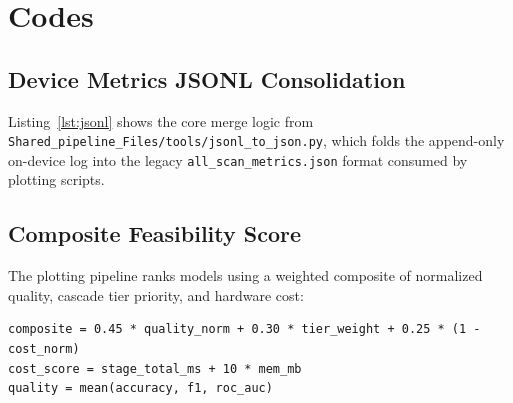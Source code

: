\lstset{
  language=Python,
  basicstyle=\ttfamily\small,
  numbers=left,
  numberstyle=\footnotesize,
  stepnumber=1,
  numbersep=2.0mm,
  breaklines=true}

\chapter{Codes}\label{ch:codes}

\section{Device Metrics JSONL Consolidation}
Listing~\ref{lst:jsonl} shows the core merge logic from \texttt{Shared\_pipeline\_Files/tools/jsonl\_to\_json.py}, which folds the append-only on-device log into the legacy \texttt{all\_scan\_metrics.json} format consumed by plotting scripts.



\section{Composite Feasibility Score}
The plotting pipeline ranks models using a weighted composite of normalized quality, cascade tier priority, and hardware cost:
\begin{lstlisting}[caption={Feasibility composite (from device\_metrics\_lib.py)},label={lst:composite}]
composite = 0.45 * quality_norm + 0.30 * tier_weight + 0.25 * (1 - cost_norm)
cost_score = stage_total_ms + 10 * mem_mb
quality = mean(accuracy, f1, roc_auc)
\end{lstlisting}

\endinput
